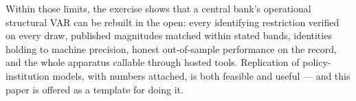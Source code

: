 \medskip

\noindent Within those limits, the exercise shows that a central bank's operational structural VAR can be rebuilt in the open: every identifying restriction verified on every draw, published magnitudes matched within stated bands, identities holding to machine precision, honest out-of-sample performance on the record, and the whole apparatus callable through hosted tools. Replication of policy-institution models, with numbers attached, is both feasible and useful --- and this paper is offered as a template for doing it.
